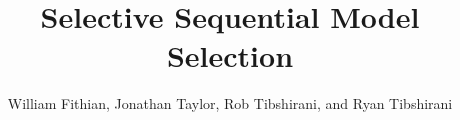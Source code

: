 \documentclass{article}
\begin{document}
\newtheorem{theorem}{Theorem}
\newtheorem{corollary}[theorem]{Corollary}
\newtheorem{lemma}[theorem]{Lemma}
\newtheorem{observation}[theorem]{Observation}
\newtheorem{proposition}[theorem]{Proposition}
\newtheorem{definition}[theorem]{Definition}
\newtheorem{claim}[theorem]{Claim}
\newtheorem{fact}[theorem]{Fact}
\newtheorem{assumption}[theorem]{Assumption}
\newtheorem{model}[theorem]{Model}

\theoremstyle{definition}
\newtheorem{example}{Example}

\newcommand{\cM}{\mathcal{M}}
\newcommand{\cH}{\mathcal{H}}
\newcommand{\cD}{\mathcal{D}}
\newcommand{\FDR}{\textnormal{FDR}}
\newcommand{\FCR}{\textnormal{FCR}}
\newcommand{\crt}{\phi}
\newcommand{\M}{\mathcal{M}}
\newcommand{\cY}{\mathcal{Y}}
\newcommand{\cX}{\mathcal{X}}
\newcommand{\cV}{\mathcal{V}}
\newcommand{\bX}{\mathbf{X}}
\newcommand{\x}{\mathbf{x}}
\newcommand{\Gv}{\;\;\big|\;\;}
\newcommand{\proj}{\cP}
\newcommand{\pow}{\text{Pow}}
\newcommand{\supp}{\text{supp}}
\newcommand{\sF}{\mathscr{F}}
\newcommand{\cF}{\mathcal{F}}
\newcommand{\sC}{\mathscr{C}}
\newcommand{\hJ}{\widehat{J}}
\newcommand{\bH}{\mathbf{H}}
\newcommand{\bM}{\mathbf{M}}
\newcommand{\tM}{\widetilde{M}}
\newcommand{\tE}{\widetilde{E}}
\newcommand{\tV}{\widetilde{V}}
\newcommand{\tR}{\widetilde{R}}
\newcommand{\tL}{\widetilde{L}}
\newcommand{\hk}{\hat{k}}
\newcommand{\hr}{\hat{r}}       
\newcommand{\cN}{\mathcal{N}}
\newcommand{\cJ}{\mathcal{J}}
\newcommand{\leqAS}{\overset{\textrm{a.s.}}{\leq}}
\newcommand{\Err}{\mathcal{E}}
\newcommand{\RSS}{\text{RSS}}


\newcommand*\mystrut{\vrule width0pt height0pt depth1.5ex\relax}
\newcommand{\underlabel}{\underbracket[1pt][.5pt]{\mystrut \quad\;\; \sub \quad\;\; }}
\newcommand{\JTcomment}[1]{{\color{blue}{(JT: \bf \sc #1) }}}
\newcommand{\WFcomment}[1]{{\color{red}{(WF: \bf \sc #1) }}}
\newcommand{\RTcomment}[1]{{\color{green}{(RT: \bf \sc #1) }}}

\title{Selective Sequential Model Selection}
\author{William Fithian, Jonathan Taylor, Rob Tibshirani, and Ryan Tibshirani}
\maketitle
\end{document}
